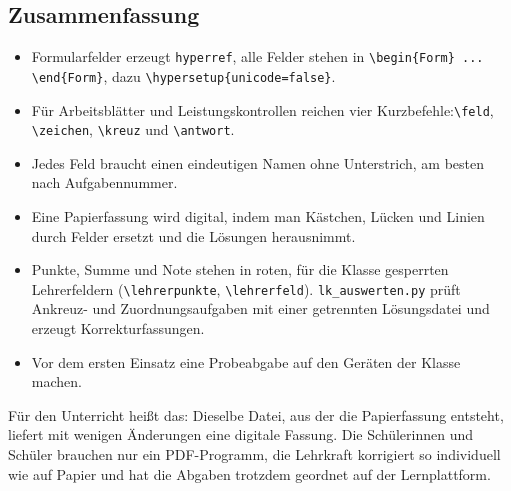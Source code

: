 \begin{Form}
\section{Zusammenfassung}

\begin{itemize}
	\item Formularfelder erzeugt \texttt{hyperref}, alle Felder stehen in
	\verb|\begin{Form} ... \end{Form}|, dazu \verb|\hypersetup{unicode=false}|.
	\item Für Arbeitsblätter und Leistungskontrollen reichen vier
	Kurzbefehle:\newline \verb|\feld|, \verb|\zeichen|, \verb|\kreuz| und
	\verb|\antwort|.
	\item Jedes Feld braucht einen eindeutigen Namen ohne Unterstrich, am
	besten nach Aufgabennummer.
	\item Eine Papierfassung wird digital, indem man Kästchen, Lücken und
	Linien durch Felder ersetzt und die Lösungen herausnimmt.
	\item Punkte, Summe und Note stehen in roten, für die Klasse gesperrten
	Lehrerfeldern (\verb|\lehrerpunkte|, \verb|\lehrerfeld|).
	\texttt{lk\_auswerten.py} prüft Ankreuz- und Zuordnungsaufgaben mit einer
	getrennten Lösungsdatei und erzeugt Korrekturfassungen.
	\item Vor dem ersten Einsatz eine Probeabgabe auf den Geräten der Klasse
	machen.
\end{itemize}

Für den Unterricht heißt das: Dieselbe Datei, aus der die Papierfassung
entsteht, liefert mit wenigen Änderungen eine digitale Fassung. Die
Schülerinnen und Schüler brauchen nur ein PDF-Programm, die Lehrkraft
korrigiert so individuell wie auf Papier und hat die Abgaben trotzdem
geordnet auf der Lernplattform.

\end{Form}

